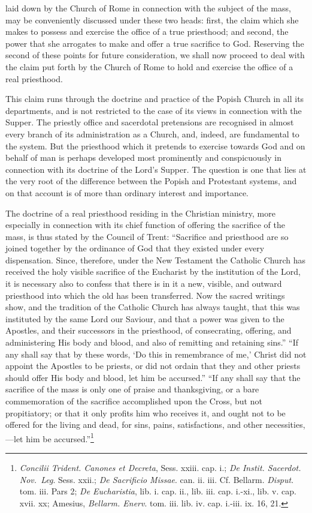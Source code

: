 \documentclass[english,]{book}
\begin{document}
laid down by the Church of Rome in connection with the subject of the mass, may be conveniently discussed under these two heads: first, the claim which she makes to possess and exercise the office of a true priesthood; and second, the power that she arrogates to make and offer a true sacrifice to God. Reserving the second of these points for future consideration, we shall now proceed to deal with the claim put forth by the Church of Rome to hold and exercise the office of a real priesthood.

This claim runs through the doctrine and practice of the Popish Church in all its departments, and is not restricted to the case of its views in connection with the Supper. The priestly office and sacerdotal pretensions are recognised in almost every branch of its administration as a Church, and, indeed, are fundamental to the system. But the priesthood which it pretends to exercise towards God and on behalf of man is perhaps developed most prominently and conspicuously in connection with its doctrine of the Lord's Supper. The question is one that lies at the very root of the difference between the Popish and Protestant systems, and on that account is of more than ordinary interest and importance.

The doctrine of a real priesthood residing in the Christian ministry, more especially in connection with its chief function of offering the sacrifice of the mass, is thus stated by the Council of Trent: ``Sacrifice and priesthood are so joined together by the ordinance of God that they existed under every dispensation. Since, therefore, under the New Testament the Catholic Church has received the holy visible sacrifice of the Eucharist by the institution of the Lord, it is necessary also to confess that there is in it a new, visible, and outward priesthood into which the old has been transferred. Now the sacred writings show, and the tradition of the Catholic Church has always taught, that this was instituted by the same Lord our Saviour, and that a power was given to the Apostles, and their successors in the priesthood, of consecrating, offering, and administering His body and blood, and also of remitting and retaining sins.'' ``If any shall say that by these words, `Do this in remembrance of me,' Christ did not appoint the Apostles to be priests, or did not ordain that they and other priests should offer His body and blood, let him be accursed.'' ``If any shall say that the sacrifice of the mass is only one of praise and thanksgiving, or a bare commemoration of the sacrifice accomplished upon the Cross, but not propitiatory; or that it only profits him who receives it, and ought not to be offered for the living and dead, for sins, pains, satisfactions, and other necessities,---let him be accursed.''\footnote{\emph{Concilii Trident. Canones et Decreta}, Sess. xxiii. cap. i.; \emph{De Instit. Sacerdot. Nov.~Leg}. Sess. xxii.; \emph{De Sacrificio Missae}. can. ii. iii. Cf. Bellarm. \emph{Disput}. tom. iii. Pars 2; \emph{De Eucharistia}, lib. i. cap. ii., lib. iii. cap. i.-xi., lib. v. cap. xvii. xx; Amesius, \emph{Bellarm. Enerv}. tom. iii. lib. iv. cap. i.-iii. ix. 16, 21.}
\end{document}
